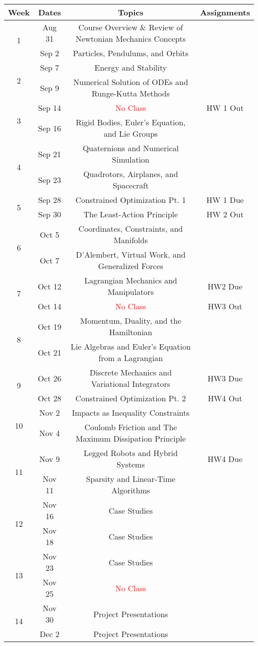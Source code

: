 \documentclass[11pt,letterpaper]{article}
\begin{document}
\begin{tabular}{c|c|c|c}
	Week & Dates & Topics & Assignments \\
	\hline
	\multirow{2}{*}{1} & Aug 31 & Course Overview \& Review of Newtonian Mechanics Concepts \\
	 & Sep 2 & Particles, Pendulums, and Orbits &  \\
	\hline
	\multirow{2}{*}{2} & Sep 7 & Energy and Stability &  \\
	 & Sep 9 & Numerical Solution of ODEs and Runge-Kutta Methods &  \\
	\hline
	\multirow{2}{*}{3} & Sep 14 &  \textcolor{red}{No Class} & HW 1 Out \\
	 & Sep 16 & Rigid Bodies, Euler's Equation, and Lie Groups &  \\
	\hline
	\multirow{2}{*}{4} & Sep 21 & Quaternions and Numerical Simulation &  \\
	 & Sep 23 & Quadrotors, Airplanes, and Spacecraft & \\
	\hline
	\multirow{2}{*}{5} & Sep 28 & Constrained Optimization Pt. 1 & HW 1 Due \\
	 & Sep 30 & The Least-Action Principle & HW 2 Out \\
	\hline
	\multirow{2}{*}{6}  & Oct 5 & Coordinates, Constraints, and Manifolds &  \\
	 & Oct 7 & D'Alembert, Virtual Work, and Generalized Forces & \\
	\hline
	\multirow{2}{*}{7}  & Oct 12 & Lagrangian Mechanics and Manipulators & HW2 Due \\
	 & Oct 14 & \textcolor{red}{No Class} & HW3 Out \\
	\hline
	\multirow{2}{*}{8}  & Oct 19 & Momentum, Duality, and the Hamiltonian & \\
	 & Oct 21 & Lie Algebras and Euler's Equation from a Lagrangian & \\
	\hline
	\multirow{2}{*}{9}  & Oct 26 & Discrete Mechanics and Variational Integrators & HW3 Due \\
	 & Oct 28 & Constrained Optimization Pt. 2 & HW4 Out  \\
	\hline
	\multirow{2}{*}{10}  & Nov 2 & Impacts as Inequality Constraints &  \\
	 & Nov 4 & Coulomb Friction and The Maximum Dissipation Principle & \\
	 \hline
	\multirow{2}{*}{11}  & Nov 9 & Legged Robots and Hybrid Systems & HW4 Due \\
	 & Nov 11 & Sparsity and Linear-Time Algorithms &   \\
	 \hline
	\multirow{2}{*}{12}  & Nov 16 & Case Studies &  \\
	 & Nov 18 & Case Studies &   \\
	 \hline
	\multirow{2}{*}{13}  & Nov 23 & Case Studies &  \\
	 & Nov 25 & \textcolor{red}{No Class} &   \\
	 \hline
	\multirow{2}{*}{14}  & Nov 30 & Project Presentations &  \\
	 & Dec 2 & Project Presentations &   \\
\end{tabular}
\end{document}
